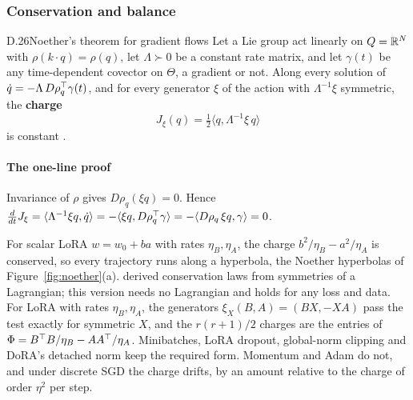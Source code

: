 \subsubsection*{Conservation and balance}

\begin{bgfact}{D.26}{Noether's theorem for gradient flows}
Let a Lie group act linearly on $Q=\mathbb{R}^N$ with $\rho(k\cdot q)=\rho(q)$, let $\Lambda\succ0$ be a constant rate matrix,
and let $\gamma(t)$ be any time-dependent covector on $\Theta$, a gradient or not. Along every solution of $\dot
q=-\Lambda\,D\rho_q^{\top}\gamma(t)$, and for every generator $\xi$ of the action with $\Lambda^{-1}\xi$ symmetric, the
\textbf{charge}
\[J_\xi(q)=\tfrac12\langle q,\Lambda^{-1}\xi\,q\rangle\]
is constant \citep{kunin2020neural,zhao2022symmetries,marcotte2023abide}.
\end{bgfact}

\paragraph{The one-line proof}
Invariance of $\rho$ gives $D\rho_q(\xi q)=0$. Hence $\tfrac{d}{dt}J_\xi=\langle\Lambda^{-1}\xi q,\dot
q\rangle=-\langle\xi q,D\rho_q^{\top}\gamma\rangle=-\langle D\rho_q\,\xi q,\gamma\rangle=0$.

For scalar LoRA $w=w_0+ba$ with rates $\eta_B,\eta_A$, the charge $b^2/\eta_B-a^2/\eta_A$ is conserved, so every
trajectory runs along a hyperbola, the Noether hyperbolas of Figure~\ref{fig:noether}(a). \citet{xnoether1918invariante}
derived conservation laws from symmetries of a Lagrangian; this version needs no Lagrangian and holds for any loss and
data. For LoRA with rates $\eta_B,\eta_A$, the generators $\xi_X(B,A)=(BX,-XA)$ pass the test exactly for symmetric $X$,
and the $r(r+1)/2$ charges are the entries of $\Phi=B^{\top} B/\eta_B-AA^{\top}/\eta_A$. Minibatches, LoRA dropout, global-norm
clipping and DoRA's detached norm keep the required form. Momentum and Adam do not, and under discrete SGD the charge
drifts, by an amount relative to the charge of order $\eta^2$ per step.


